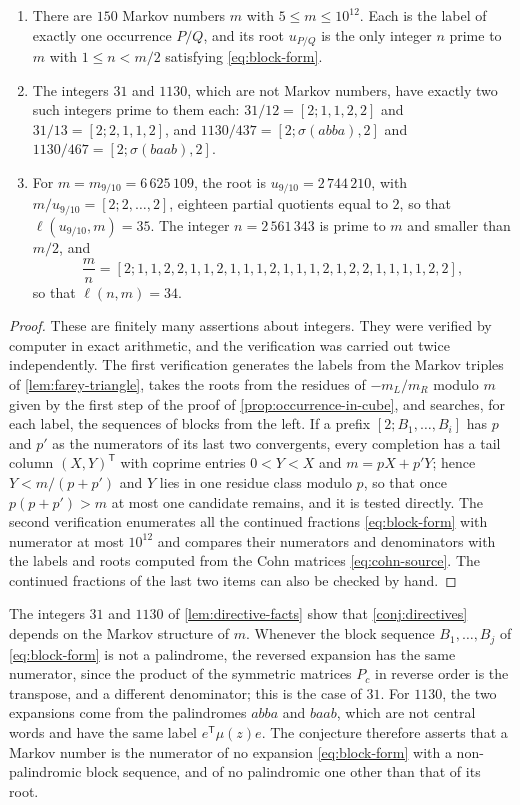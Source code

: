 \begin{lemma}\label{lem:directive-facts}
\begin{enumerate}[label=\textup{(\roman*)},leftmargin=*]
\item There are $150$ Markov numbers $m$ with $5\leqslant m\leqslant10^{12}$. Each
 is the label of exactly one occurrence $P/Q$, and its root $u_{P/Q}$ is the
 only integer $n$ prime to $m$ with $1\leqslant n<m/2$ satisfying
 \eqref{eq:block-form}.
\item The integers $31$ and $1130$, which are not Markov numbers, have exactly
 two such integers prime to them each: $31/12=[2;1,1,2,2]$ and $31/13=[2;2,1,1,2]$, and
 $1130/437=[2;\sigma(abba),2]$ and $1130/467=[2;\sigma(baab),2]$.
\item For $m=m_{9/10}=6\,625\,109$, the root is $u_{9/10}=2\,744\,210$, with
 $m/u_{9/10}=[2;2,\ldots,2]$, eighteen partial quotients equal to $2$, so that
 $\ell(u_{9/10},m)=35$. The integer $n=2\,561\,343$ is prime to $m$ and smaller
 than $m/2$, and
 $$
 \frac mn=[2;1,1,2,2,1,1,2,1,1,1,2,1,1,1,2,1,2,2,1,1,1,1,2,2],
 $$
 so that $\ell(n,m)=34$.
\end{enumerate}
\end{lemma}

\begin{proof}
These are finitely many assertions about integers. They were verified by
computer in exact arithmetic, and the verification was carried out twice
independently. The first verification generates the labels from the Markov
triples of \cref{lem:farey-triangle}, takes the roots from the residues of
$-m_L/m_R$ modulo $m$ given by the first step of the proof of
\cref{prop:occurrence-in-cube}, and searches, for each label, the sequences of
blocks from the left. If a prefix $[2;B_1,\ldots,B_i]$ has $p$ and $p'$ as the
numerators of its last two convergents, every completion has a tail column
$(X,Y)^{\mathsf T}$ with coprime entries $0<Y<X$ and $m=pX+p'Y$; hence
$Y<m/(p+p')$ and $Y$ lies in one residue class modulo $p$, so that once
$p(p+p')>m$ at most one candidate remains, and it is tested directly. The
second verification enumerates all the continued fractions
\eqref{eq:block-form} with numerator at most $10^{12}$ and compares their
numerators and denominators with the labels and roots computed from the
Cohn matrices \eqref{eq:cohn-source}. The continued fractions of the last two
items can also be checked by hand.
\end{proof}

The integers $31$ and $1130$ of \cref{lem:directive-facts} show that
\cref{conj:directives} depends on the Markov structure of $m$. Whenever the block sequence $B_1,\ldots,B_j$ of \eqref{eq:block-form}
is not a palindrome, the reversed expansion has the same numerator, since
the product of the symmetric matrices $P_c$ in reverse order is the
transpose, and a different denominator; this is the case of $31$. For
$1130$, the two expansions come from the palindromes $abba$ and $baab$, which
are not central words and have the same label $e^{\mathsf T}\mu(z)e$. The
conjecture therefore asserts that a Markov number is the numerator of no
expansion \eqref{eq:block-form} with a non-palindromic block sequence, and of
no palindromic one other than that of its root.

